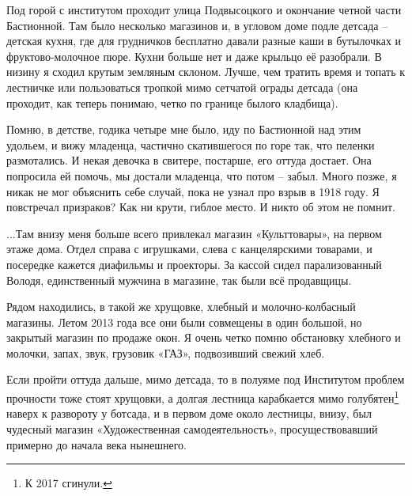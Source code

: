 Под горой с институтом проходит улица Подвысоцкого и окончание четной части Бастионной. Там было несколько магазинов и, в угловом доме подле детсада – детская кухня, где для грудничков бесплатно давали разные каши в бутылочках и фруктово-молочное пюре. Кухни больше нет и даже крыльцо её разобрали. В низину я сходил крутым земляным склоном. Лучше, чем тратить время и топать к лестничке или пользоваться тропкой мимо сетчатой ограды детсада (она проходит, как теперь понимаю, четко по границе былого кладбища).

Помню, в детстве, годика четыре мне было, иду по Бастионной над этим удольем, и вижу младенца, частично скатившегося по горе так, что пеленки размотались. И некая девочка в свитере, постарше, его оттуда достает. Она попросила ей помочь, мы достали младенца, что потом – забыл. Много позже, я никак не мог объяснить себе случай, пока не узнал про взрыв в 1918 году. Я повстречал призраков? Как ни крути, гиблое место. И никто об этом не помнит.

...Там внизу меня больше всего привлекал магазин «Культтовары», на первом этаже дома. Отдел справа с игрушками, слева с канцелярскими товарами, и посередке кажется диафильмы и проекторы. За кассой сидел парализованный Володя, единственный мужчина в магазине, так были всё продавщицы.

Рядом находились, в такой же хрущовке, хлебный и молочно-колбасный магазины. Летом 2013 года все они были совмещены в один большой, но закрытый магазин по продаже окон. Я очень четко помню обстановку хлебного и молочки, запах, звук, грузовик «ГАЗ», подвозивший свежий хлеб.

Если пройти оттуда дальше, мимо детсада, то в полуяме под Институтом проблем прочности тоже стоят хрущовки, а долгая лестница карабкается мимо голубятен\footnote{К 2017 сгинули.} наверх к развороту у ботсада, и в первом доме около лестницы, внизу, был чудесный магазин «Художественная самодеятельность», просуществовавший примерно до начала века нынешнего. 

